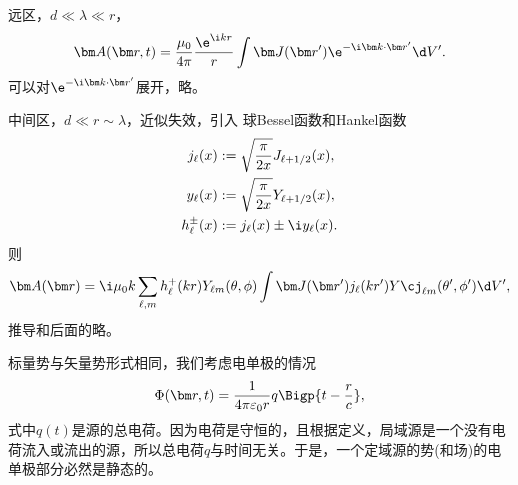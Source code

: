远区，$d\ll\lambda\ll r$，
\[
    \bm A(\bm r,t)=\frac{\mu_0}{4\pi}\frac{\e^{\i kr}}r\int\bm J(\bm r')\e^{-\i\bm k\cdot\bm r'}\d V'.
\]
可以对$\e^{-\i\bm k\cdot\bm r'}$展开，略。

中间区，$d\ll r\sim\lambda$，近似失效，引入
球Bessel函数和Hankel函数
\begin{align}
    j_\ell(x)&:=\sqrt{\frac\pi{2x}}J_{\ell+1/2}(x),\\
    y_\ell(x)&:=\sqrt{\frac\pi{2x}}Y_{\ell+1/2}(x),\\
    h^\pm_\ell(x)&:=j_\ell(x)\pm\i y_\ell(x).
\end{align}
则
\[
    \bm A(\bm r)=\i\mu_0k\sum_{\ell,m}h_\ell^+(kr)Y_{\ell m}(\theta,\phi)\int\bm J(\bm r')j_\ell(kr')Y\cj_{\ell m}(\theta',\phi')\d V',
\]
推导和后面的略。

标量势与矢量势形式相同，我们考虑电单极的情况
\[
    \Phi(\bm r,t)=\frac1{4\pi\varepsilon_0r}q\Bigp{t-\frac rc},
\]
式中$q(t)$是源的总电荷。因为电荷是守恒的，且根据定义，局域源是一个没有电荷流入或流出的源，所以总电荷$q$与时间无关。于是，一个定域源的势(和场)的电单极部分必然是静态的。%

